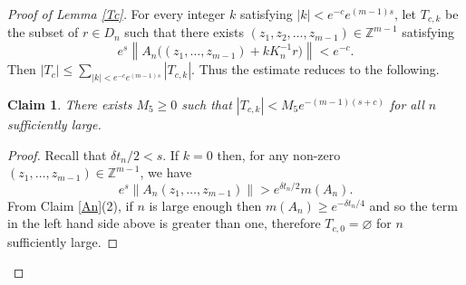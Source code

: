 \documentclass[10pt,reqno]{amsart}
\theoremstyle{Theorem}
\newtheorem{claim}[theorem]{Claim}
\theoremstyle{definition}
\theoremstyle{remark}
\newcommand{\note}[1]{\marginpar{{\color{red}\footnotesize \begin{spacing}{1}#1\end{spacing}}}}
\renewcommand{\emptyset}{\varnothing}
\newcommand{\Z}{\mathbb {Z}}
\newcommand{\inv}{^{-1}}
\newcommand{\id}{\mathrm{Id}}
\begin{document}
\begin{proof}[Proof of Lemma \ref{Tc}]
For every integer $k$ satisfying  $|k| < e^{-c} e^{(m-1)s}$, let $T_{c,k}$ be the subset of $r\in D_n$ such that there exists $(z_1,z_2, \dots, z_{m-1})\in \Z^{m-1}$  satisfying
$$e^s\left\| A_n \Big(
(z_1, \dots, z_{m-1})
 +
k K_n\inv   r
\Big)
\right\|< e^{-c}.$$
 Then $|T_c| \leq   \sum_{|k| < e^{-c} e^{(m-1)s}} |T_{c,k}|.$   Thus the estimate reduces to the following.





\begin{claim}\label{rennes} There exists $M_5 \geq 0$ such that $|T_{c,k} |< M_5 e^{-(m-1)(s+c)}$  for all $n$ sufficiently  large.
\end{claim}
\begin{proof}Recall that $\delta t_n/2 <s$.
If $k = 0$ then,   for any non-zero $(z_1, \dots,  z_{m-1})\in \Z^{m-1}$, we have \[ e^s\left \| A_n
(z_1, \dots,  z_{m-1})
\right \| > e^{\delta t_n/2} m(A_n).
\]
From Claim \ref{An}(2),  if $n$ is large enough then  $m(A_n)\ge e^{-\delta t_n/4}$ and so the term in the left hand side above is greater than one, therefore $T_{c,0} = \emptyset$ for $n$ sufficiently large.


\end{proof}
\end{proof}
\end{document}
